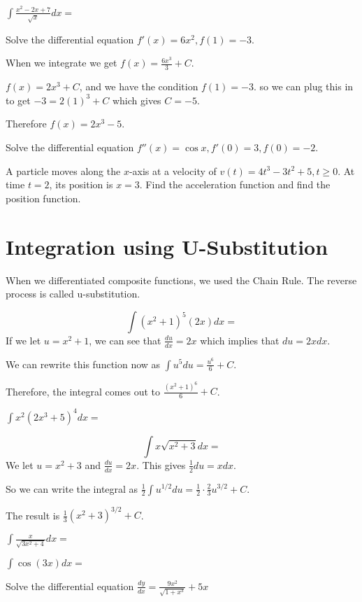 \documentclass[../bccalc.tex]{subfiles}
\begin{document}
\ex $\int \frac{x^2-2x+7}{\sqrt{x}}dx =$

\begin{example}
    Solve the differential equation $f'(x)=6x^2, f(1)=-3$.

    When we integrate we get $f(x)=\frac{6x^3}{3}+C$.

    $f(x)=2x^3+C$, and we have the condition $f(1)=-3$. so we can plug this in to get $-3=2(1)^3+C$ which gives $C=-5$.

    Therefore $f(x)=2x^3-5$.
\end{example}

\ex Solve the differential equation $f''(x)=\cos x, f'(0)=3, f(0)=-2$.

\ex A particle moves along the $x$-axis at a velocity of $v(t)=4t^3-3t^2+5, t\geq 0$. At time $t=2$, its position is $x=3$. Find the acceleration function and find the position function.
\section{Integration using U-Substitution}
When we differentiated composite functions, we used the Chain Rule. The reverse process is called u-substitution.

\begin{example}
    \[ \int (x^2+1)^5(2x)dx=\]
    If we let $u=x^2+1$, we can see that $\frac{du}{dx}=2x$ which implies that $du=2xdx$.

    We can rewrite this function now as $\int u^5 du = \frac{u^6}{6}+C$.

    Therefore, the integral comes out to $\frac{(x^2+1)^6}{6}+C$.
\end{example}

\ex $\int x^2(2x^3+5)^4 dx=$

\begin{example}
    \[ \int x\sqrt{x^2+3}dx = \]
    We let $u=x^2+3$ and $\frac{du}{dx}=2x$. This gives $\frac{1}{2}du = xdx$.

    So we can write the integral as $\frac{1}{2}\int u^{1/2}du = \frac{1}{2}\cdot \frac{2}{3}u^{3/2}+C$.

    The result is $\frac{1}{3}(x^2+3)^{3/2}+C$.
\end{example}

\ex $\int \frac{x}{\sqrt{3x^2+4}}dx=$

\ex $\int \cos(3x)dx=$

\ex Solve the differential equation $\frac{dy}{dx}=\frac{9x^2}{\sqrt{1+x^3}}+5x$
\end{document}
